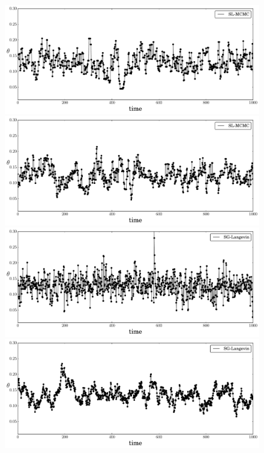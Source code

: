 \documentclass[]{article}
\begin{document}
\begin{figure}[t]
\setlength{\linewidth}{\textwidth}
\setlength{\hsize}{\textwidth}
\begin{center}
\includegraphics[width=0.95\columnwidth]{./images/exp-SL-MCMC-theta-timeseries-omega-rate-100p0-chain0.pdf}
\includegraphics[width=0.95\columnwidth]{./images/exponential/exp2-SL-MCMC-theta-timeseries-omega-rate-0p1-chain3.pdf}
\includegraphics[width=0.95\columnwidth]{./images/exp-SG-Langevin-theta-timeseries-omega-rate-100p0-chain0.pdf}
\includegraphics[width=0.95\columnwidth]{./images/exponential/exp2-SG-Langevin-theta-timeseries-omega-rate-0p1-chain3.pdf}

\end{center}
\end{figure}
\end{document}
